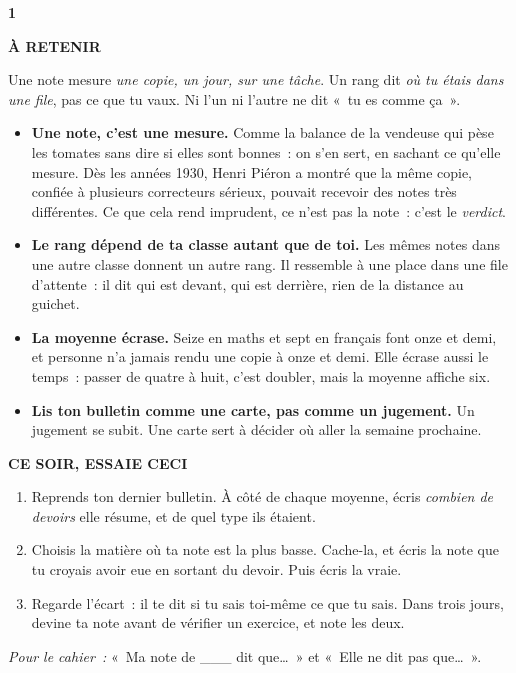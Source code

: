 \documentclass[10pt,twoside,openany]{book}
\newenvironment{aretenir}[1][À retenir]{\par\begin{tcolorbox}[enhanced,colback=creme,colframe=accent,boxrule=0pt,leftrule=3pt,arc=0pt,left=8pt,right=8pt,top=5pt,bottom=5pt,breakable]{\small\bfseries\color{accent}\MakeUppercase{#1}}\par\smallskip}{\end{tcolorbox}\par}
\newenvironment{cesoir}[1][Ce soir, essaie ceci]{\par\begin{tcolorbox}[enhanced,colback=white,colframe=vert,boxrule=0.6pt,arc=2pt,left=8pt,right=8pt,top=5pt,bottom=5pt,breakable]{\small\bfseries\color{vert}\MakeUppercase{#1}}\par\smallskip\small}{\end{tcolorbox}\par}
\newcommand{\fiche}[3]{\clearpage\markright{#2}\thispagestyle{plain}%
 {\noindent\color{accent}\fontsize{40}{40}\selectfont\bfseries #1}\hspace{0.6em}{\Large\bfseries #2\par}\vspace{0.1em}{\small\color{gris}\itshape #3\par}\vspace{0.5em}}
\begin{document}
\fiche{1}{Le rang}{Chapitre 1 du livre}
\begin{aretenir}
Une note mesure \emph{une copie, un jour, sur une tâche}. Un rang dit \emph{où tu étais dans une file}, pas ce que tu vaux. Ni l’un ni l’autre ne dit « tu es comme ça ».
\end{aretenir}
\begin{itemize}
\item \textbf{Une note, c’est une mesure.} Comme la balance de la vendeuse qui pèse les tomates sans dire si elles sont bonnes : on s’en sert, en sachant ce qu’elle mesure. Dès les années 1930, Henri Piéron a montré que la même copie, confiée à plusieurs correcteurs sérieux, pouvait recevoir des notes très différentes. Ce que cela rend imprudent, ce n’est pas la note : c’est le \emph{verdict}.
\item \textbf{Le rang dépend de ta classe autant que de toi.} Les mêmes notes dans une autre classe donnent un autre rang. Il ressemble à une place dans une file d’attente : il dit qui est devant, qui est derrière, rien de la distance au guichet.
\item \textbf{La moyenne écrase.} Seize en maths et sept en français font onze et demi, et personne n’a jamais rendu une copie à onze et demi. Elle écrase aussi le temps : passer de quatre à huit, c’est doubler, mais la moyenne affiche six.
\item \textbf{Lis ton bulletin comme une carte, pas comme un jugement.} Un jugement se subit. Une carte sert à décider où aller la semaine prochaine.
\end{itemize}
\begin{cesoir}
\begin{enumerate}
\item Reprends ton dernier bulletin. À côté de chaque moyenne, écris \emph{combien de devoirs} elle résume, et de quel type ils étaient.
\item Choisis la matière où ta note est la plus basse. Cache-la, et écris la note que tu croyais avoir eue en sortant du devoir. Puis écris la vraie.
\item Regarde l’écart : il te dit si tu sais toi-même ce que tu sais. Dans trois jours, devine ta note avant de vérifier un exercice, et note les deux.
\end{enumerate}
\emph{Pour le cahier :} « Ma note de \_\_\_ dit que… » et « Elle ne dit pas que… ».
\end{cesoir}
\end{document}
